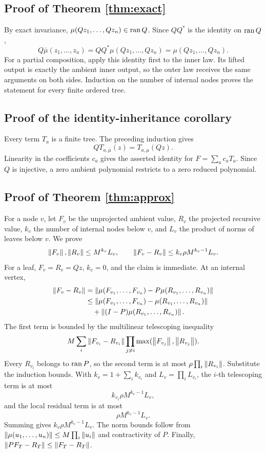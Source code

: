 \subsection{Proof of Theorem \ref{thm:exact}}

By exact invariance, \(\mu(Qz_1,\ldots,Qz_n)\in\operatorname{ran} Q\). Since \(QQ^*\) is
the identity on \(\operatorname{ran} Q\),
\[
Q\bar\mu(z_1,\ldots,z_n)
=QQ^*\mu(Qz_1,\ldots,Qz_n)
=\mu(Qz_1,\ldots,Qz_n).
\]
For a partial composition, apply this identity first to the inner law. Its
lifted output is exactly the ambient inner output, so the outer law receives
the same arguments on both sides. Induction on the number of internal nodes
proves the statement for every finite ordered tree.

\subsection{Proof of the identity-inheritance corollary}

Every term \(T_a\) is a finite tree. The preceding induction gives
\[
QT_{a,\bar\mu}(z)=T_{a,\mu}(Qz).
\]
Linearity in the coefficients \(c_a\) gives the asserted identity for
\(F=\sum_ac_aT_a\). Since \(Q\) is injective, a zero ambient polynomial
restricts to a zero reduced polynomial.

\subsection{Proof of Theorem \ref{thm:approx}}

For a node \(v\), let \(F_v\) be the unprojected ambient value, \(R_v\) the
projected recursive value, \(k_v\) the number of internal nodes below \(v\),
and \(L_v\) the product of norms of leaves below \(v\). We prove
\[
\left\lVert F_v\right\rVert,\left\lVert R_v\right\rVert\leq M^{k_v}L_v,\qquad
\left\lVert F_v-R_v\right\rVert\leq k_v\rho M^{k_v-1}L_v.
\]
For a leaf, \(F_v=R_v=Qz\), \(k_v=0\), and the claim is immediate. At an
internal vertex,
\[
\begin{aligned}
\left\lVert F_v-R_v\right\rVert
&=\left\lVert \mu(F_{v_1},\ldots,F_{v_n})
-P\mu(R_{v_1},\ldots,R_{v_n})\right\rVert\\
&\leq \left\lVert \mu(F_{v_1},\ldots,F_{v_n})
-\mu(R_{v_1},\ldots,R_{v_n})\right\rVert\\
&\quad+\left\lVert (I-P)\mu(R_{v_1},\ldots,R_{v_n})\right\rVert.
\end{aligned}
\]
The first term is bounded by the multilinear telescoping inequality
\[
M\sum_i\left\lVert F_{v_i}-R_{v_i}\right\rVert
\prod_{j\ne i}\max(\left\lVert F_{v_j}\right\rVert,\left\lVert R_{v_j}\right\rVert).
\]
Every \(R_{v_i}\) belongs to \(\operatorname{ran} P\), so the second term is at most
\(\rho\prod_i\left\lVert R_{v_i}\right\rVert\). Substitute the induction bounds. With
\(k_v=1+\sum_i k_{v_i}\) and \(L_v=\prod_iL_{v_i}\), the \(i\)-th telescoping
term is at most
\[
k_{v_i}\rho M^{k_v-1}L_v,
\]
and the local residual term is at most
\[
\rho M^{k_v-1}L_v.
\]
Summing gives \(k_v\rho M^{k_v-1}L_v\). The norm bounds follow from
\(\left\lVert \mu(u_1,\ldots,u_n)\right\rVert\leq M\prod_i\left\lVert u_i\right\rVert\) and contractivity of
\(P\). Finally, \(\left\lVert PF_T-R_T\right\rVert\leq\left\lVert F_T-R_T\right\rVert\).

